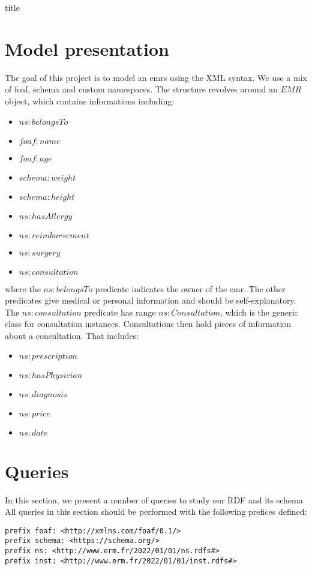 \documentclass[12pt]{article}
\begin{document}
{title}

\tableofcontents




\section{Model presentation}
The goal of this project is to model an \glspl{emr} using the XML syntax. We use a mix of foaf, schema and custom namespaces. The structure revolves around an \(EMR\) object, which contains informations including:
\begin{itemize}
    \item \(ns:belongsTo\)
    \item \(foaf:name\)
    \item \(foaf:age\)
    \item \(schema:weight\)
    \item \(schema:height\)
    \item \(ns:hasAllergy\)
    \item \(ns:reimbursement\)
    \item \(ns:surgery\)
    \item \(ns:consultation\)
\end{itemize}
where the \(ns:belongsTo\) predicate indicates the owner of the \gls{emr}. The other predicates give medical or personal information and should be self-explanatory. \\
The \(ns:consultation\) predicate has range \(ns:Consultation\), which is the generic class for consultation instances. Consultations then hold pieces of information about a consultation. That includes:
\begin{itemize}
    \item \(ns:prescription\)
    \item \(ns:hasPhysician\)
    \item \(ns:diagnosis\)
    \item \(ns:price\)
    \item \(ns:date\)
\end{itemize}


\section{Queries}
In this section, we present a number of queries to study our RDF and its schema
All queries in this section should be performed with the following prefices defined:
\begin{verbatim}
prefix foaf: <http://xmlns.com/foaf/0.1/>
prefix schema: <https://schema.org/>
prefix ns: <http://www.erm.fr/2022/01/01/ns.rdfs#>
prefix inst: <http://www.erm.fr/2022/01/01/inst.rdfs#>
\end{verbatim}
\end{document}
